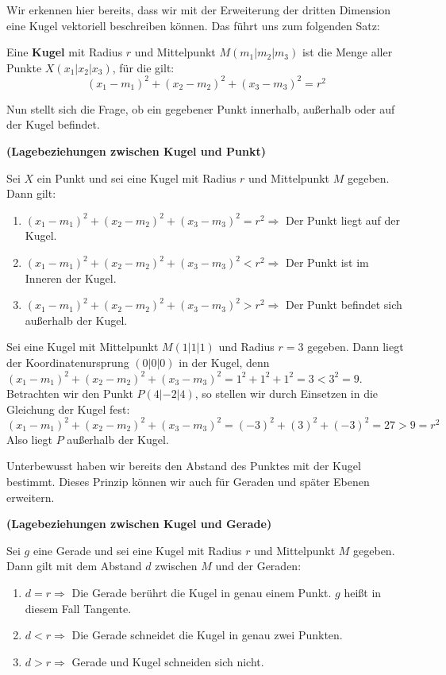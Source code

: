 \documentclass[ngerman, 12pt]{nssheetxea}
\begin{document}
Wir erkennen hier bereits, dass wir mit der Erweiterung der dritten Dimension eine Kugel vektoriell beschreiben können. Das führt uns zum folgenden Satz:

\begin{definition}
Eine \textbf{Kugel} mit Radius $r$ und Mittelpunkt $M(m_1|m_2|m_3)$ ist die Menge aller Punkte $X(x_1|x_2|x_3)$, für die gilt: 
\[  (x_1-m_1)^2+(x_2-m_2)^2 + (x_3-m_3)^2 = r^2  \]
\end{definition}

Nun stellt sich die Frage, ob ein gegebener Punkt innerhalb, außerhalb oder auf der Kugel befindet. 

\begin{theorem} \textbf{(Lagebeziehungen zwischen Kugel und Punkt)} \par
Sei $X$ ein Punkt und sei eine Kugel mit Radius $r$ und Mittelpunkt $M$ gegeben. Dann gilt:
\begin{enumerate}
\item $(x_1-m_1)^2+(x_2-m_2)^2 + (x_3-m_3)^2 = r^2 \Rightarrow$ Der Punkt liegt auf der Kugel.
\item $(x_1-m_1)^2+(x_2-m_2)^2 + (x_3-m_3)^2 < r^2 \Rightarrow$ Der Punkt ist im Inneren der Kugel.
\item $(x_1-m_1)^2+(x_2-m_2)^2 + (x_3-m_3)^2 > r^2 \Rightarrow$ Der Punkt befindet sich außerhalb der Kugel.
\end{enumerate}
\end{theorem}

\begin{example}
Sei eine Kugel mit Mittelpunkt $M(1|1|1)$ und Radius $r=3$ gegeben. Dann liegt der Koordinatenursprung $(0|0|0)$ in der Kugel, denn $(x_1-m_1)^2+(x_2-m_2)^2 + (x_3-m_3)^2 = 1^2+1^2+1^2 =  3 < 3^2 = 9$. Betrachten wir den Punkt $P(4|-2|4)$, so stellen wir durch Einsetzen in die Gleichung der Kugel fest:
\[  (x_1-m_1)^2+(x_2-m_2)^2 + (x_3-m_3)^2 = (-3)^2 + (3)^2 + (-3)^2 = 27 > 9 = r^2  \]
Also liegt $P$ außerhalb der Kugel. 
\end{example}

Unterbewusst haben wir bereits den Abstand des Punktes mit der Kugel bestimmt. Dieses Prinzip können wir auch für Geraden und später Ebenen erweitern. 


\begin{theorem} \textbf{(Lagebeziehungen zwischen Kugel und Gerade)} \par
Sei $g$ eine Gerade und sei eine Kugel mit Radius $r$ und Mittelpunkt $M$ gegeben. Dann gilt mit dem Abstand $d$ zwischen $M$ und der Geraden:
\begin{enumerate}
\item $d=r \Rightarrow$ Die Gerade berührt die Kugel in genau einem Punkt. $g$ heißt in diesem Fall Tangente.
\item $d<r\Rightarrow$ Die Gerade schneidet die Kugel in genau zwei Punkten. 
\item $d>r \Rightarrow$ Gerade und Kugel schneiden sich nicht.
\end{enumerate}
\end{theorem}
\end{document}
